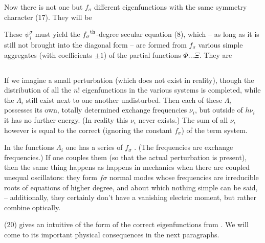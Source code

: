 \begin{paper}{1}
Now there is not one but $f_\sigma$ different eigenfunctions with the same symmetry character (17). They will be

These $\psi_i^\sigma$ must yield the ${f_\sigma}^\text{th}$-degree secular equation (8), which -- as long as it is still not brought into the diagonal form -- are formed from $f_\sigma$ various simple aggregates (with coefficients $\pm 1$) of the partial functions $\Phi\dots\Xi$. They are

\subsection{} If we imagine a small perturbation (which does not exist in reality), though the distribution of all the $n!$ eigenfunctions in the various systems is completed, while the $\Lambda_i$ still exist next to one another undisturbed. Then each of these $\Lambda_i$ possesses its own, totally determined exchange frequencies $\nu_i$, but outside of $h\nu_i$ it has no further energy. (In reality this $\nu_i$ never exists.) The sum of all $\nu_i$ however is
equal to the correct  (ignoring the constant $f_\sigma$) of the term system.

In the functions $\Lambda_i$ one has a series of $f_\sigma$ . (The frequencies are exchange frequencies.) If one couples them (so that the actual perturbation is present), then the same thing happens as happens in mechanics when there are coupled unequal oscillators: they form $f\sigma$ normal modes whose frequencies are irreducible roots of equations of higher degree, and about which nothing simple can be said, -- additionally, they certainly don’t have a vanishing electric moment, but rather combine optically.

(20) gives an intuitive of the form of the correct eigenfunctions from . We will come to its important physical consequences in the next paragraphs.


\end{paper}
